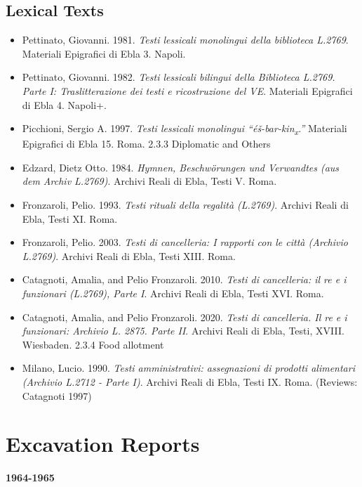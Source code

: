 \documentclass[
]{book}
\providecommand{\tightlist}{%
  \setlength{\itemsep}{0pt}\setlength{\parskip}{0pt}}
\begin{document}
\hypertarget{lexical-texts}{%
\subsection{Lexical Texts}\label{lexical-texts}}

\begin{itemize}
\tightlist
\item
  Pettinato, Giovanni. 1981. \emph{Testi lessicali monolingui della biblioteca L.2769}. Materiali Epigrafici di Ebla 3. Napoli.
\item
  Pettinato, Giovanni. 1982. \emph{Testi lessicali bilingui della Biblioteca L.2769. Parte I: Traslitterazione dei testi e ricostruzione del VE}. Materiali Epigrafici di Ebla 4. Napoli+.
\item
  Picchioni, Sergio A. 1997. \emph{Testi lessicali monolingui ``éš-bar-kin\textsubscript{x}.''} Materiali Epigrafici di Ebla 15. Roma.
  2.3.3 Diplomatic and Others
\item
  Edzard, Dietz Otto. 1984. \emph{Hymnen, Beschwörungen und Verwandtes (aus dem Archiv L.2769)}. Archivi Reali di Ebla, Testi V. Roma.
\item
  Fronzaroli, Pelio. 1993. \emph{Testi rituali della regalità (L.2769)}. Archivi Reali di Ebla, Testi XI. Roma.
\item
  Fronzaroli, Pelio. 2003. \emph{Testi di cancelleria: I rapporti con le città (Archivio L.2769)}. Archivi Reali di Ebla, Testi XIII. Roma.
\item
  Catagnoti, Amalia, and Pelio Fronzaroli. 2010. \emph{Testi di cancelleria: il re e i funzionari (L.2769), Parte I}. Archivi Reali di Ebla, Testi XVI. Roma.
\item
  Catagnoti, Amalia, and Pelio Fronzaroli. 2020. \emph{Testi di cancelleria. Il re e i funzionari: Archivio L. 2875. Parte II}. Archivi Reali di Ebla, Testi, XVIII. Wiesbaden.
  2.3.4 Food allotment
\item
  Milano, Lucio. 1990. \emph{Testi amministrativi: assegnazioni di prodotti alimentari (Archivio L.2712 - Parte I)}. Archivi Reali di Ebla, Testi IX. Roma. (Reviews: Catagnoti 1997)
\end{itemize}

\hypertarget{excavation-reports}{%
\section{Excavation Reports}\label{excavation-reports}}

\textbf{1964-1965}
\end{document}
